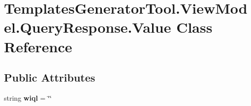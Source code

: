 \hypertarget{class_templates_generator_tool_1_1_view_model_1_1_query_response_1_1_value}{}\section{Templates\+Generator\+Tool.\+View\+Model.\+Query\+Response.\+Value Class Reference}
\label{class_templates_generator_tool_1_1_view_model_1_1_query_response_1_1_value}
\subsection*{Public Attributes}
\begin{DoxyCompactItemize}
\item 
\mbox{\label{class_templates_generator_tool_1_1_view_model_1_1_query_response_1_1_value_a3da850e40a5c746d53e23aec7da73265}} 
string {\bfseries wiql} = \char`\"{}\char`\"{}
\end{DoxyCompactItemize}
